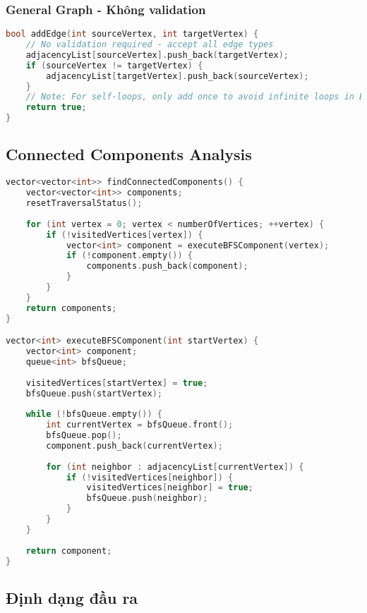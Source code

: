 \documentclass[12pt]{article}
\begin{document}
\subsubsection*{General Graph - Không validation}
\begin{lstlisting}[language=C++, basicstyle=\ttfamily\footnotesize, frame=single]
bool addEdge(int sourceVertex, int targetVertex) {
    // No validation required - accept all edge types
    adjacencyList[sourceVertex].push_back(targetVertex);
    if (sourceVertex != targetVertex) {
        adjacencyList[targetVertex].push_back(sourceVertex);
    }
    // Note: For self-loops, only add once to avoid infinite loops in BFS
    return true;
}
\end{lstlisting}

\subsection*{Connected Components Analysis}

\begin{lstlisting}[language=C++, basicstyle=\ttfamily\footnotesize, frame=single]
vector<vector<int>> findConnectedComponents() {
    vector<vector<int>> components;
    resetTraversalStatus();
    
    for (int vertex = 0; vertex < numberOfVertices; ++vertex) {
        if (!visitedVertices[vertex]) {
            vector<int> component = executeBFSComponent(vertex);
            if (!component.empty()) {
                components.push_back(component);
            }
        }
    }
    return components;
}

vector<int> executeBFSComponent(int startVertex) {
    vector<int> component;
    queue<int> bfsQueue;
    
    visitedVertices[startVertex] = true;
    bfsQueue.push(startVertex);
    
    while (!bfsQueue.empty()) {
        int currentVertex = bfsQueue.front();
        bfsQueue.pop();
        component.push_back(currentVertex);
        
        for (int neighbor : adjacencyList[currentVertex]) {
            if (!visitedVertices[neighbor]) {
                visitedVertices[neighbor] = true;
                bfsQueue.push(neighbor);
            }
        }
    }
    
    return component;
}
\end{lstlisting}

\subsection*{Định dạng đầu ra}
\end{document}
